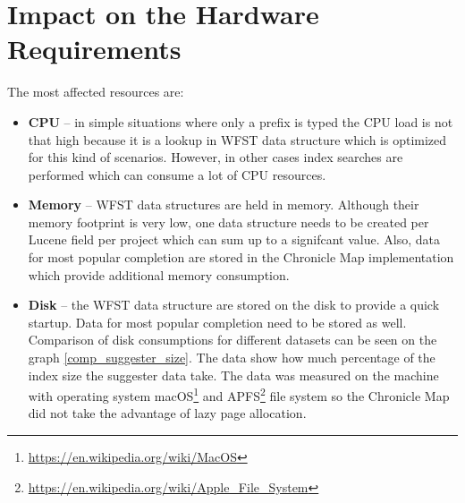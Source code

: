 \section{Impact on the Hardware Requirements}
\label{hw_req_impact}
The most affected resources are:
\begin{itemize}
    \item \textbf{CPU} – in simple situations where only a prefix is typed the CPU load is not that high because it
    is a lookup in WFST data structure which is optimized for this kind of scenarios. However, in other cases
    index searches are performed which can consume a lot of CPU resources.
    \item \textbf{Memory} – WFST data structures are held in memory. Although their memory footprint is very low,
    one data structure needs to be created per Lucene field per project which can sum up to a signifcant value.
    Also, data for most popular completion are stored in the Chronicle Map implementation which provide additional
    memory consumption.
    \item \textbf{Disk} – the WFST data structure are stored on the disk to provide a quick startup.
    Data for most popular completion need to be stored as well. Comparison of disk consumptions for different datasets
    can be seen on the graph \ref{comp_suggester_size}. The data show how much percentage of the index size the suggester
    data take. The data was measured on the machine with operating system
    macOS\footnote{\url{https://en.wikipedia.org/wiki/MacOS}} and
    APFS\footnote{\url{https://en.wikipedia.org/wiki/Apple_File_System}} file system so the Chronicle Map did not take the
    advantage of lazy page allocation.


\end{itemize}
